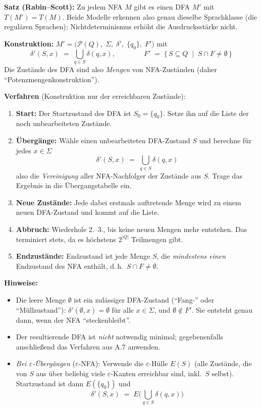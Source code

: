 \medskip
\noindent\textbf{Satz (Rabin--Scott):} Zu jedem NFA $M$ gibt es einen DFA $M'$ mit $T(M')=T(M)$. Beide Modelle erkennen also genau dieselbe Sprachklasse (die regulären Sprachen); Nichtdeterminismus erhöht die Ausdrucksstärke nicht.

\medskip
\noindent\textbf{Konstruktion:} $M' = \big(\mathcal{P}(Q),\;\Sigma,\;\delta',\;\{q_0\},\;F'\big)$ mit
\[
  \delta'(S,x) \;=\; \bigcup_{q\in S}\delta(q,x),
  \qquad\qquad
  F' \;=\; \{\, S\subseteq Q \;\mid\; S\cap F \neq \emptyset \,\}
\]
Die Zustände des DFA sind also \emph{Mengen} von NFA-Zuständen (daher \enquote{Potenzmengenkonstruktion}).

\medskip
\noindent\textbf{Verfahren} (Konstruktion nur der erreichbaren Zustände):
\begin{enumerate}[1.]
  \item \textbf{Start:} Der Startzustand des DFA ist $S_0 = \{q_0\}$. Setze ihn auf die Liste der noch unbearbeiteten Zustände.
  \item \textbf{Übergänge:} Wähle einen unbearbeiteten DFA-Zustand $S$ und berechne für jedes $x\in\Sigma$
  \[
    \delta'(S,x) \;=\; \bigcup_{q\in S}\delta(q,x)
  \]
  also die \emph{Vereinigung} aller NFA-Nachfolger der Zustände aus $S$. Trage das Ergebnis in die Übergangstabelle ein.
  \item \textbf{Neue Zustände:} Jede dabei erstmals auftretende Menge wird zu einem neuen DFA-Zustand und kommt auf die Liste.
  \item \textbf{Abbruch:} Wiederhole 2.--3., bis keine neuen Mengen mehr entstehen. Das terminiert stets, da es höchstens $2^{|Q|}$ Teilmengen gibt.
  \item \textbf{Endzustände:} Endzustand ist jede Menge $S$, die \emph{mindestens einen} Endzustand des NFA enthält, d.\,h.\ $S\cap F \neq \emptyset$.
\end{enumerate}

\medskip
\noindent\textbf{Hinweise:}
\begin{itemize}
  \item Die leere Menge $\emptyset$ ist ein zulässiger DFA-Zustand (\enquote{Fang-} oder \enquote{Müllzustand}): $\delta'(\emptyset,x)=\emptyset$ für alle $x\in\Sigma$, und $\emptyset\notin F'$. Sie entsteht genau dann, wenn der NFA \enquote{steckenbleibt}.
  \item Der resultierende DFA ist \emph{nicht} notwendig minimal; gegebenenfalls anschließend das Verfahren aus A.7 anwenden.
  \item \textit{Bei $\varepsilon$-Übergängen} ($\varepsilon$-NFA): Verwende die $\varepsilon$-Hülle $E(S)$ (alle Zustände, die von $S$ aus über beliebig viele $\varepsilon$-Kanten erreichbar sind, inkl.\ $S$ selbst). Startzustand ist dann $E(\{q_0\})$ und
  \[
    \delta'(S,x) \;=\; E\Big(\textstyle\bigcup_{q\in S}\delta(q,x)\Big)
  \]
\end{itemize}

